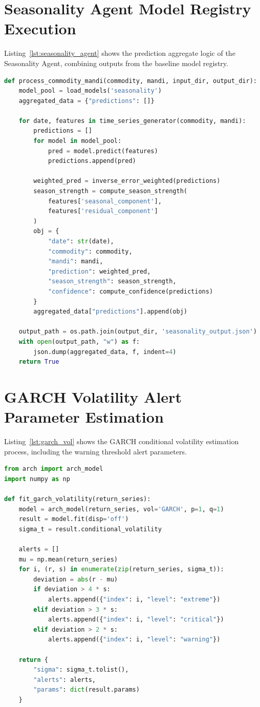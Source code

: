\documentclass[12pt,a4paper]{report}
\theoremstyle{definition}
\theoremstyle{remark}
\begin{document}
\section{Seasonality Agent Model Registry Execution}
Listing~\ref{lst:seasonality_agent} shows the prediction aggregate logic of the Seasonality Agent, combining outputs from the baseline model registry.

\begin{lstlisting}[language=Python, caption={Seasonality Agent Model Registry (agent\_seasonality.py).}, label=lst:seasonality_agent]
def process_commodity_mandi(commodity, mandi, input_dir, output_dir):
    model_pool = load_models('seasonality')
    aggregated_data = {"predictions": []}

    for date, features in time_series_generator(commodity, mandi):
        predictions = []
        for model in model_pool:
            pred = model.predict(features)
            predictions.append(pred)

        weighted_pred = inverse_error_weighted(predictions)
        season_strength = compute_season_strength(
            features['seasonal_component'],
            features['residual_component']
        )
        obj = {
            "date": str(date),
            "commodity": commodity,
            "mandi": mandi,
            "prediction": weighted_pred,
            "season_strength": season_strength,
            "confidence": compute_confidence(predictions)
        }
        aggregated_data["predictions"].append(obj)

    output_path = os.path.join(output_dir, 'seasonality_output.json')
    with open(output_path, "w") as f:
        json.dump(aggregated_data, f, indent=4)
    return True
\end{lstlisting}

\section{GARCH Volatility Alert Parameter Estimation}
Listing~\ref{lst:garch_vol} shows the GARCH conditional volatility estimation process, including the warning threshold alert parameters.

\begin{lstlisting}[language=Python, caption={GARCH Volatility Estimation and Alert Generation.}, label=lst:garch_vol]
from arch import arch_model
import numpy as np

def fit_garch_volatility(return_series):
    model = arch_model(return_series, vol='GARCH', p=1, q=1)
    result = model.fit(disp='off')
    sigma_t = result.conditional_volatility

    alerts = []
    mu = np.mean(return_series)
    for i, (r, s) in enumerate(zip(return_series, sigma_t)):
        deviation = abs(r - mu)
        if deviation > 4 * s:
            alerts.append({"index": i, "level": "extreme"})
        elif deviation > 3 * s:
            alerts.append({"index": i, "level": "critical"})
        elif deviation > 2 * s:
            alerts.append({"index": i, "level": "warning"})

    return {
        "sigma": sigma_t.tolist(),
        "alerts": alerts,
        "params": dict(result.params)
    }
\end{lstlisting}
\end{document}
